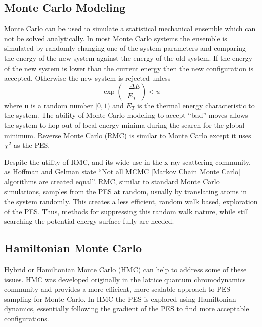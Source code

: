 \subsection{Monte Carlo Modeling}
Monte Carlo can be used to simulate a statistical mechanical ensemble which can not be solved analytically.
In most Monte Carlo systems the ensemble is simulated by randomly changing one of the system parameters and comparing the energy of the new system against the energy of the old system.
If the energy of the new system is lower than the current energy then the new configuration is accepted.
Otherwise the new system is rejected unless
\begin{equation}
\exp(\frac{-\Delta E}{E_{T}}) < u
\end{equation}
where u is a random number $[0, 1)$ and $E_{T}$ is the thermal energy characteristic to the system.
The ability of Monte Carlo modeling to accept ``bad'' moves allows the system to hop out of local energy minima during the search for the global minimum.
Reverse Monte Carlo (RMC) is similar to Monte Carlo except it uses $\chi^{2}$ as the PES.\cite{McGreevy}

Despite the utility of RMC, and its wide use in the x-ray scattering community, as Hoffman and Gelman state ``Not all MCMC [Markov Chain Monte Carlo] algorithms are created equal''.\cite{Hoffman2014}
RMC, similar to standard Monte Carlo simulations, samples from the PES at random, usually by translating atoms in the system randomly.
This creates a less efficient, random walk based, exploration of the PES.\cite{Hoffman2014, Neal1993}
Thus, methods for suppressing this random walk nature, while still searching the potential energy surface fully are needed.

\subsection{Hamiltonian Monte Carlo}
Hybrid or Hamiltonian Monte Carlo (HMC) can help to address some of these issues.
HMC was developed originally in the lattice quantum chromodynamics community and provides a more efficient, more scalable approach to PES sampling for Monte Carlo.\cite{Duane1987216, Neal2011}
In HMC the PES is explored using Hamiltonian dynamics, essentially following the gradient of the PES to find more acceptable configurations.


